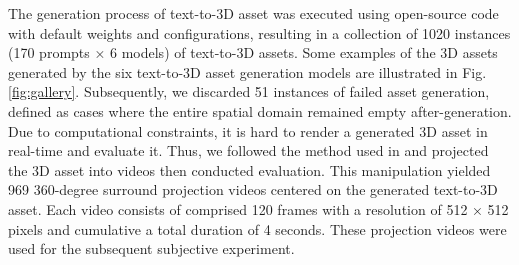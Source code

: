 The generation process of text-to-3D asset was executed using open-source code \cite{threestudio2023} with default weights and configurations, resulting in a collection of 1020 instances (170 prompts × 6 models) of text-to-3D assets. Some examples of the 3D assets generated by the six text-to-3D asset generation models are illustrated in Fig.  \ref{fig:gallery}. Subsequently, we discarded 51 instances of failed asset generation, defined as cases where the entire spatial domain remained empty after-generation. Due to computational constraints, it is hard to render a generated 3D asset in real-time and evaluate it. Thus, we followed the method used in \cite{zhang2023eep} and projected the 3D asset into videos then conducted evaluation. This manipulation yielded 969 360-degree surround projection videos centered on the generated text-to-3D asset. Each video consists of comprised 120 frames with a resolution of 512 × 512 pixels and cumulative a total duration of 4 seconds. These projection videos were used for the subsequent subjective experiment.

\vspace{-10pt}
